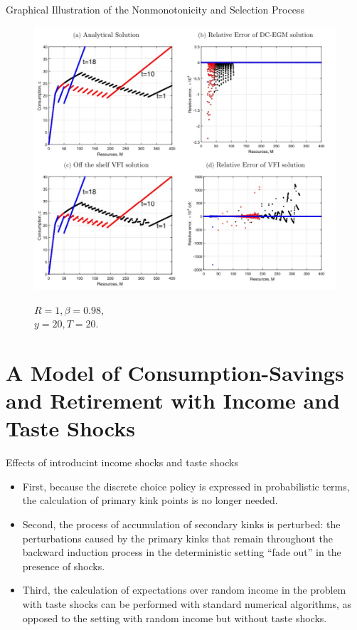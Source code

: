 \documentclass[aspectratio=169]{beamer}
\newcommand{\highlight}[1]{{\color{red}{#1}}}
\begin{document}
\begin{frame}{Graphical Illustration of the Nonmonotonicity and Selection Process}
	\begin{figure}[htbp!]
		\begin{minipage}{0.55\linewidth}
			\includegraphics[scale=0.55]{fig2.jpg}
		\end{minipage}
		\begin{minipage}{0.4\linewidth}
			$R = 1, \beta = 0.98$, \\ $y = 20, T = 20$. \\ \highlight{MATLAB Implementation!!!}
		\end{minipage}
	\end{figure}
\end{frame}

\section[Stochastic Model]{A Model of Consumption-Savings and Retirement with Income and Taste Shocks}

\begin{frame}{Effects of introducint income shocks and taste shocks}
	\begin{itemize}
		\item First, because the discrete choice policy is expressed in probabilistic terms, the calculation of primary kink points is no longer needed.
		\item Second, the process of accumulation of secondary kinks is perturbed: the perturbations caused by the primary kinks that remain throughout the backward induction process in the deterministic setting ``fade out'' in the presence of shocks.
		\item Third, the calculation of expectations over random income in the problem with taste shocks can be performed with standard numerical algorithms, as opposed to the setting with random income but without taste shocks.
	\end{itemize}
\end{frame}
\end{document}
